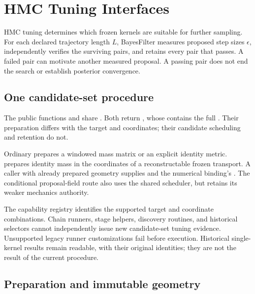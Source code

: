 \chapter{HMC Tuning Interfaces}
\label{ch:bf-hmc-tuning-interfaces}

HMC tuning determines which frozen kernels are suitable for further sampling.
For each declared trajectory length $L$, BayesFilter measures proposed step sizes
$\epsilon$, independently verifies the surviving pairs, and retains every pair
that passes. A failed pair can motivate another measured proposal. A passing
pair does not end the search or establish posterior convergence.

\section{One candidate-set procedure}

The public functions  and
 share
. Both return
, whose  contains the full
. Their preparation differs with the target
and coordinates; their candidate scheduling and retention do not.

Ordinary  prepares a windowed mass matrix or an
explicit identity metric.  prepares
identity mass in the coordinates of a reconstructable frozen transport.
A caller with already prepared geometry supplies 
and the numerical binding's . The conditional
 proposal-field route also uses the shared
scheduler, but retains its weaker mechanics authority.

The capability registry  identifies the
supported target and coordinate combinations. Chain runners, stage helpers,
discovery routines, and historical selectors cannot independently issue new
candidate-set tuning evidence. Unsupported legacy runner customizations fail
before execution. Historical single-kernel results remain readable, with their
original identities; they are not the result of the current procedure.



\section{Preparation and immutable geometry}

